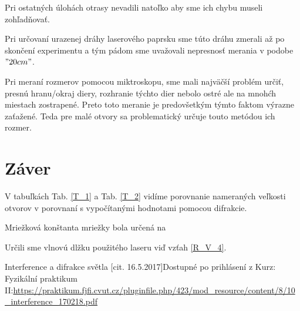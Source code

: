 \documentclass[10pt]{scrartcl}
\begin{document}
Pri ostatných úlohách otrasy nevadili natoľko aby sme ich chybu museli zohľadňovať.

Pri určovaní urazenej dráhy laserového paprsku sme túto dráhu zmerali až po skončení experimentu a tým pádom sme uvažovali nepresnosť merania v podobe $"20 cm"$.

Pri meraní rozmerov pomocou miktroskopu, sme mali najväčší problém určiť, presnú hranu/okraj diery, rozhranie týchto dier nebolo ostré ale na mnohćh miestach zostrapené. Preto toto meranie je predovšetkým týmto faktom výrazne zaťažené. Teda pre malé otvory sa problematický určuje touto metódou ich rozmer. 

\section{Záver}

V tabuľkách Tab. \ref{T_1} a Tab. \ref{T_2} vidíme porovnanie nameraných veľkosti otvorov v porovnaní s vypočítanými hodnotami pomocou difrakcie.

Mriežková konštanta mriežky bola určená na

Určili sme vlnovú dlžku použitého laseru viď vzťah \ref{R_V_4}.

\begin{thebibliography}{2}
Interference a difrakce světla [cit. 16.5.2017]Dostupné po prihlásení z Kurz: Fyzikální praktikum II:\url{https://praktikum.fjfi.cvut.cz/pluginfile.php/423/mod_resource/content/8/10_interference_170218.pdf}




\end{thebibliography}
\end{document}
